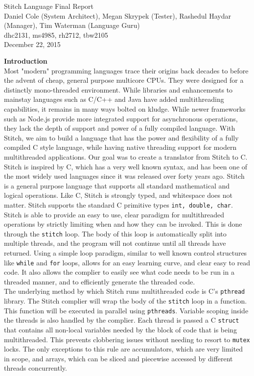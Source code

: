 \documentclass[11pt, oneside]{article}   	%
\date{}							%
\begin{document}
\begin{center}
\LARGE
Stitch Language Final Report\\[2em]
\Large 
Daniel Cole (System Architect), Megan Skrypek (Tester), Rashedul Haydar (Manager), Tim Waterman (Language Guru)\\
\large dhc2131, ms4985, rh2712, tbw2105\\[2em]
\normalsize
December 22, 2015\\[3em]
\end{center}

\newpage

\LARGE\textbf{Introduction}\\[2em]
\normalsize
Most "modern" programming languages trace their origins back decades to before the advent of cheap, general purpose multicore CPUs.  They were designed for a distinctly mono-threaded environment.  While libraries and enhancements to mainstay languages such as C/C++ and Java have added multithreading capabilities, it remains in many ways bolted on kludge.  While newer frameworks such as Node.js provide more integrated support for asynchronous operations, they lack the depth of support and power of a fully compiled language.  With Stitch, we aim to build a language that has the power and flexibility of a fully compiled C style language, while having native threading support for modern multithreaded applications.  Our goal was to create a translator from Stitch to C.\\[.5em]
Stitch is inspired by C, which has a very well known syntax, and has been one of the most widely used languages since it was released over forty years ago.  Stitch is a general purpose language that supports all standard mathematical and logical operations.  Like C, Stitch is strongly typed, and whitespace does not matter.  Stitch supports the standard C primitive types \verb|int, double, char|.\\[.5em]
Stitch is able to provide an easy to use, clear paradigm for multithreaded operations by strictly limiting when and how they can be invoked.  This is done through the \verb|stitch| loop.  The body of this loop is automatically split into multiple threads, and the program will not continue until all threads have returned.  Using a simple loop paradigm, similar to well known control structures like \verb|while| and \verb|for| loops, allows for an easy learning curve, and clear easy to read code.  It also allows the complier to easily see what code needs to be run in a threaded manner, and to efficiently generate the threaded code.\\[.5em]
The underlying method by which Stitch runs multithreaded code is C's \verb|pthread| library.  The Stitch complier will wrap the body of the \verb|stitch| loop in a function.  This function will be executed in parallel using \verb|pthreads|.  Variable scoping inside the threads is also handled by the complier.  Each thread is passed a C \verb|struct| that contains all non-local variables needed by the block of code that is being multithreaded.  This prevents clobbering issues without needing to resort to \verb|mutex| locks.  The only exceptions to this rule are accumulators, which are very limited in scope, and arrays, which can be sliced and piecewise accessed by different threads concurrently.   
\end{document}
